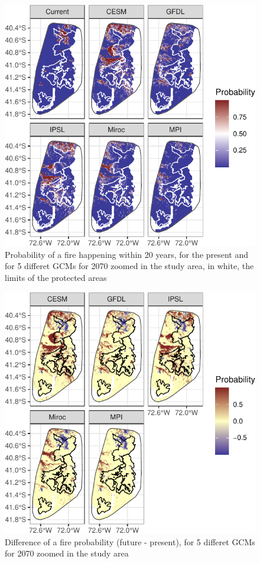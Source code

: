 \documentclass[
]{article}
\begin{document}
\begin{figure}
\centering
\includegraphics{Methods_files/figure-latex/PredsFireFocus-1.pdf}
\caption{\label{fig:PredsFireFocus}Probability of a fire happening within 20 years, for the present and for 5 differet GCMs for 2070 zoomed in the study area, in white, the limits of the protected areas}
\end{figure}

\begin{figure}
\centering
\includegraphics{Methods_files/figure-latex/PredsDiff-1.pdf}
\caption{\label{fig:PredsDiff}Difference of a fire probability (future - present), for 5 differet GCMs for 2070 zoomed in the study area}
\end{figure}
\end{document}
